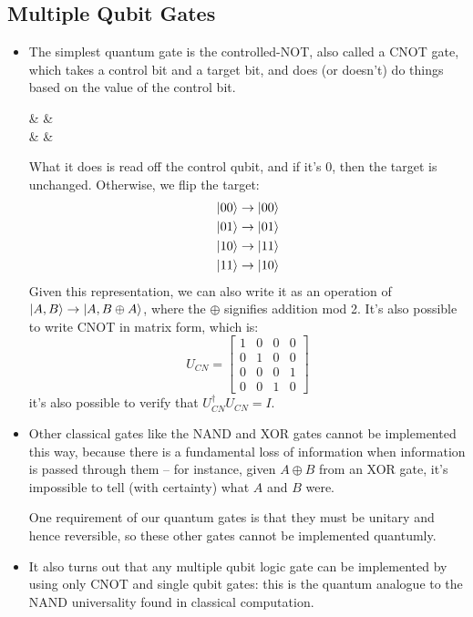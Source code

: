 \subsection{Multiple Qubit Gates}
\begin{itemize}
	\item The simplest quantum gate is the controlled-NOT, also called a CNOT gate, which takes a 
		control bit and a target bit, and does (or doesn't) do things based on the value of the control bit.  
		\begin{center}
			\begin{quantikz}
				 &  & \\
				 & \targ{} & 
			\end{quantikz}
		\end{center}
		What it does is read off the control qubit, and if it's 0, then the target is unchanged. Otherwise, 
		we flip the target:
		\begin{align*}
			\ket{00} &\to \ket{00}\\
			\ket{01} & \to \ket{01}\\
			\ket{10} &\to \ket{11}\\
			\ket{11} &\to \ket{10}
		\end{align*}
		Given this representation, we can also write it as an operation of 
		\( \ket{A, B} \to \ket{A, B\oplus A} \), 
		where the \( \oplus \) signifies addition mod 2. 
		It's also possible to write CNOT in matrix form, which is:
		\[
			U_{CN} = \begin{bmatrix} 1 & 0&0&0\\0&1&0&0\\0&0&0&1\\0&0&1&0 \end{bmatrix} 
		\] 
		it's also possible to verify that \( U_{CN}^\dagger U_{CN} = I\).
	\item Other classical gates like the NAND and XOR gates cannot be implemented this way, because there 
		is a fundamental loss of information when information is passed through them -- for instance, 
		given \( A \oplus B \) from an XOR gate, it's impossible to tell (with certainty) what \( A \) and 
		\( B \) were. 

		One requirement of our quantum gates is that they must be unitary and hence reversible, so these other 
		gates cannot be implemented quantumly.
	\item It also turns out that any multiple qubit logic gate can be implemented by using only CNOT and single 
		qubit gates: this is the quantum analogue to the NAND universality found in classical 
		computation.
\end{itemize}
